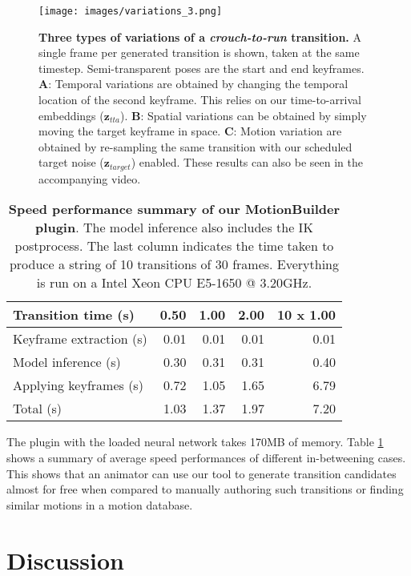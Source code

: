 \documentclass[acmtog]{acmart}
\newcommand{\bz}{\textbf{z}}
\begin{document}
\begin{figure}[h]
\begin{center}
\centerline{\texttt{[image: images/variations\_3.png]}}
  \caption{\textbf{Three types of variations of a \textit{crouch-to-run} transition.} A single frame per generated transition is shown, taken at the same timestep. Semi-transparent poses are the start and end keyframes. \textbf{A}: Temporal variations are obtained by changing the temporal location of the second keyframe. This relies on our time-to-arrival embeddings ($\bz_{\mathit{tta}}$). \textbf{B}: Spatial variations can be obtained by simply moving the target keyframe in space. \textbf{C}: Motion variation are obtained by re-sampling the same transition with our scheduled target noise ($\bz_{\mathit{target}}$) enabled. These results can also be seen in the accompanying video.}
  \label{fig:variations}
\end{center}
\vspace{-0.5cm}
\end{figure}
\begin{table}[h]
    \centering
    \caption{\textbf{Speed performance summary of our MotionBuilder plugin}. The model inference also includes the IK postprocess. The last column indicates the time taken to produce a string of 10 transitions of 30 frames. Everything is run on a Intel Xeon CPU E5-1650 @ 3.20GHz.}
    \small
\begin{tabular}{lrrr|r}
        Transition time (s)  & 0.50 &1.00 &2.00 &10 x 1.00\\
        \midrule
         Keyframe extraction (s)& 0.01 &0.01  &0.01 &0.01\\
         Model inference (s)    & 0.30 &0.31  &0.31 &0.40\\
         Applying keyframes (s) & 0.72 &1.05  &1.65 &6.79\\
         Total (s)              & 1.03 &1.37  &1.97 &7.20
    \end{tabular}
    \label{table:perfo}
\end{table} 
The plugin with the loaded neural network takes 170MB of memory. Table \ref{table:perfo} shows a summary of average speed performances of different in-betweening cases. This shows that an animator can use our tool to generate transition candidates almost for free when compared to manually authoring such transitions or finding similar motions in a motion database.

\section{Discussion}
\end{document}
